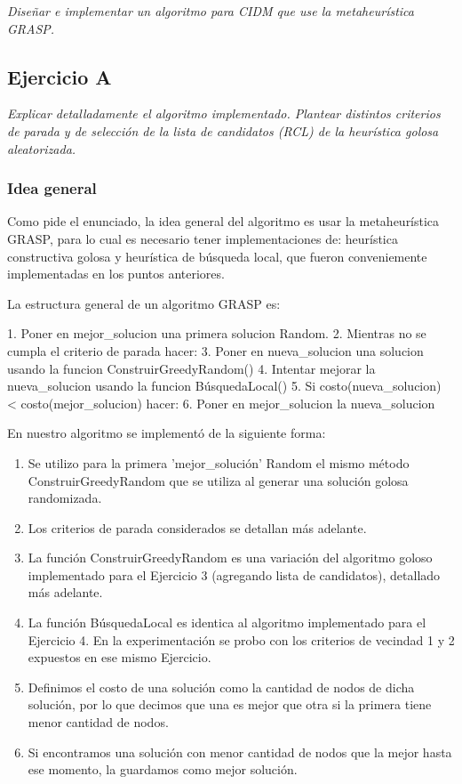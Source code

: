 \textit{Diseñar e implementar un algoritmo para CIDM que use la metaheurística GRASP.}

\subsection{Ejercicio A}

\textit{Explicar detalladamente el algoritmo implementado. Plantear distintos criterios de parada y de selección de la lista de candidatos (RCL) de la heurística golosa aleatorizada.}

\medskip

\subsubsection{Idea general}

Como pide el enunciado, la idea general del algoritmo es usar la metaheurística GRASP, para lo cual es necesario tener implementaciones de: heurística constructiva golosa y heurística de búsqueda local, que fueron conveniemente implementadas en los puntos anteriores.

La estructura general de un algoritmo GRASP es:

\begin{codesnippet}
1. Poner en mejor_solucion una primera solucion Random.
2. Mientras no se cumpla el criterio de parada hacer:
3.     Poner en nueva_solucion una solucion usando la funcion ConstruirGreedyRandom()
4.     Intentar mejorar la nueva_solucion usando la funcion BúsquedaLocal()
5.     Si costo(nueva_solucion) < costo(mejor_solucion) hacer:
6.         Poner en mejor_solucion la nueva_solucion
\end{codesnippet}

En nuestro algoritmo se implementó de la siguiente forma:
\begin{enumerate}
    \item Se utilizo para la primera 'mejor_solución' Random el mismo método ConstruirGreedyRandom que se utiliza al generar una solución golosa randomizada.
    \item Los criterios de parada considerados se detallan más adelante.
    \item La función ConstruirGreedyRandom es una variación del algoritmo goloso implementado para el Ejercicio 3 (agregando lista de candidatos), detallado más adelante.
    \item La función BúsquedaLocal es identica al algoritmo implementado para el Ejercicio 4. En la experimentación se probo con los criterios de vecindad 1 y 2 expuestos en ese mismo Ejercicio.
    \item Definimos el costo de una solución como la cantidad de nodos de dicha solución, por lo que decimos que una es mejor que otra si la primera tiene menor cantidad de nodos.
    \item Si encontramos una solución con menor cantidad de nodos que la mejor hasta ese momento, la guardamos como mejor solución.
\end{enumerate}


